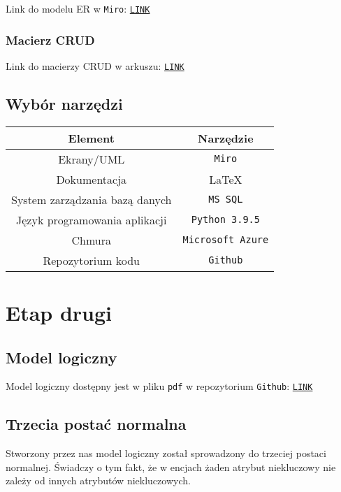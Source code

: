 \documentclass[12pt]{article}
\begin{document}
\noindent Link do modelu ER w \texttt{Miro}: \noindent\texttt{\href{https://miro.com/app/board/o9J_lL9uIOo=/}{LINK}}

\subsubsection{Macierz CRUD}

\noindent Link do macierzy CRUD w arkuszu: \texttt{\href{https://wutwaw-my.sharepoint.com/:x:/g/personal/01143627_pw_edu_pl/EWBP5IBfqCFLiPvmQnpEDcAB0eGgw4UuIhm6bPNvxlSkyA?e=69XRhd}{LINK}}

\subsection{Wybór narzędzi}
\begin{table}[!h]
    \begin{center}
        \begin{tabular}{c|c}
            \textbf{Element} & \textbf{Narzędzie} \\
            \hline
            Ekrany/UML & \texttt{Miro} \\
            Dokumentacja & \LaTeX{} \\
            System zarządzania bazą danych & \texttt{MS SQL} \\
            Język programowania aplikacji & \texttt{Python 3.9.5} \\
            Chmura & \texttt{Microsoft Azure} \\
            Repozytorium kodu & \texttt{Github}
        \end{tabular}
    \end{center}
\end{table}

\pagebreak %

\section{Etap drugi}

\subsection{Model logiczny}
\noindent Model logiczny dostępny jest w pliku \texttt{pdf} w repozytorium \texttt{Github}:
\texttt{\href{https://github.com/JMazurkiewicz/BD2-Catering/blob/master/docs/logical-model.pdf}{LINK}}

\subsection{Trzecia postać normalna}
Stworzony przez nas model logiczny został sprowadzony do trzeciej postaci normalnej. Świadczy o tym fakt, że w encjach żaden atrybut niekluczowy nie zależy od innych atrybutów niekluczowych.
\end{document}
